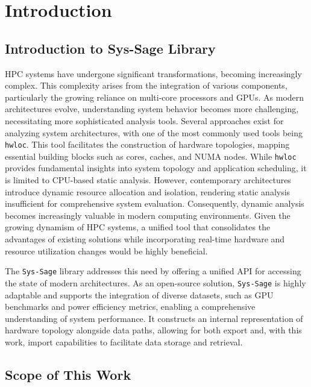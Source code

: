 
\chapter{Introduction}\label{chapter:introduction}
\section{Introduction to Sys-Sage Library}

\ac{HPC} systems have undergone significant transformations, becoming increasingly complex. This complexity arises from the integration of various components, particularly the growing reliance on multi-core processors and \ac{GPU}s. As modern architectures evolve, understanding system behavior becomes more challenging, necessitating more sophisticated analysis tools. Several approaches exist for analyzing system architectures, with one of the most commonly used tools being \texttt{hwloc}. This tool facilitates the construction of hardware topologies, mapping essential building blocks such as cores, caches, and \ac{NUMA} nodes. While \texttt{hwloc} provides fundamental insights into system topology and application scheduling, it is limited to \ac{CPU}-based static analysis. However, contemporary architectures introduce dynamic resource allocation and isolation, rendering static analysis insufficient for comprehensive system evaluation. Consequently, dynamic analysis becomes increasingly valuable in modern computing environments. Given the growing dynamism of \ac{HPC} systems, a unified tool that consolidates the advantages of existing solutions while incorporating real-time hardware and resource utilization changes would be highly beneficial. \cite{sys-sage} \cite{numa}

The \texttt{Sys-Sage} library addresses this need by offering a unified \ac{API} for accessing the state of modern architectures. As an open-source solution, \texttt{Sys-Sage} is highly adaptable and supports the integration of diverse datasets, such as \ac{GPU} benchmarks and power efficiency metrics, enabling a comprehensive understanding of system performance. It constructs an internal representation of hardware topology alongside data paths, allowing for both export and, with this work, import capabilities to facilitate data storage and retrieval. \cite{sys-sage} \cite{py-c-api}

\section{Scope of This Work}

